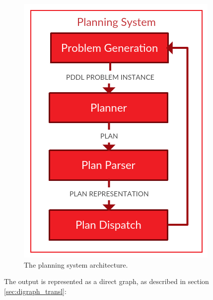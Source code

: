 \documentclass[pdftex,12pt,a4paper]{report}
\begin{document}
\begin{figure}[H]
	\centering
	\includegraphics[scale=0.3]{images/dia_system.png}
	\caption{The planning system architecture.}
\end{figure}

\noindent The output is represented as a direct graph, as described in section \ref{sec:digraph_transl}:
\end{document}
